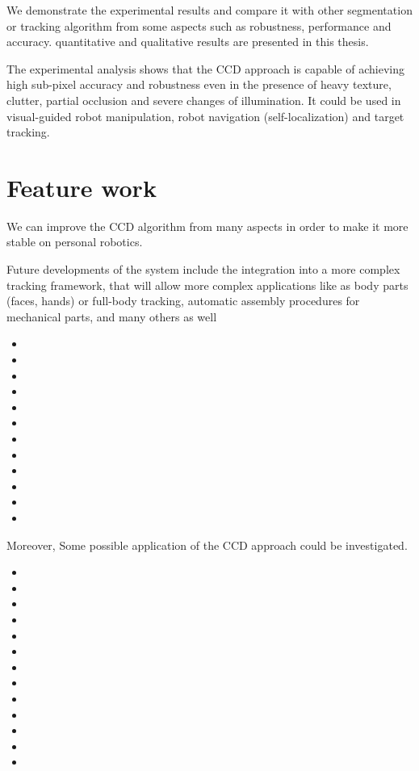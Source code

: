 We demonstrate the experimental results and compare it with other
segmentation or tracking algorithm from some aspects such as
robustness, performance and accuracy. quantitative and qualitative
results are presented in this thesis.

The experimental analysis shows that the CCD approach is capable of
achieving high sub-pixel accuracy and robustness even in the presence
of heavy texture, clutter, partial occlusion and severe changes of
illumination. It could be used in  visual-guided robot
manipulation, robot navigation (self-localization) and target
tracking.

\section{Feature work}
\label{sec:feature}
We can improve the CCD algorithm from many aspects in order to make it
more stable on personal robotics.

Future developments of the system include the integration
into a more complex tracking framework, that
will allow more complex applications like as body parts
(faces, hands) or full-body tracking, automatic assembly
procedures for mechanical parts, and many others as well
\begin{itemize}
\item
\item
\item
\item
\item
\item
\item
\item
\item
\item
\item
\item 
\end{itemize}

Moreover, Some possible application of the CCD approach could be
investigated.
\begin{itemize}
\item
\item
\item
\item
\item
\item
\item
\item
\item
\item
\item
\item
\item 
\end{itemize}
